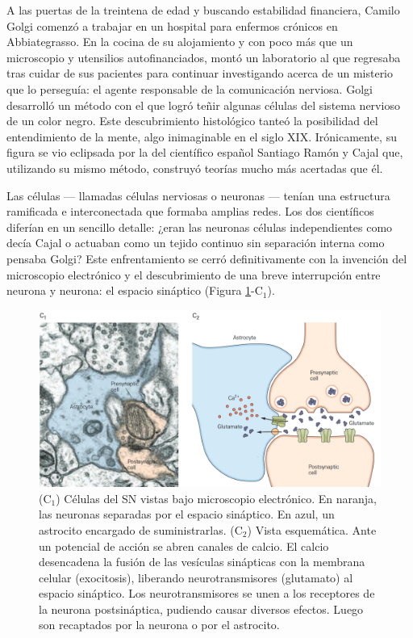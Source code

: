 A las puertas de la treintena de edad y buscando estabilidad financiera, Camilo Golgi comenzó a trabajar en un hospital para enfermos crónicos en Abbiategrasso. En la cocina de su alojamiento y con poco más que un microscopio y utensilios autofinanciados, montó un laboratorio al que regresaba tras cuidar de sus pacientes para continuar investigando acerca de un misterio que lo perseguía: el agente responsable de la comunicación nerviosa. Golgi desarrolló un método con el que logró teñir algunas células del sistema nervioso de un color negro. Este descubrimiento histológico tanteó la posibilidad del entendimiento de la mente, algo inimaginable en el siglo XIX. Irónicamente, su figura se vio eclipsada por la del científico español Santiago Ramón y Cajal que, utilizando su mismo método, construyó teorías mucho más acertadas que él.

Las células --- llamadas células nerviosas o neuronas --- tenían una estructura ramificada e interconectada que formaba amplias redes. Los dos científicos diferían en un sencillo detalle: ¿eran las neuronas células independientes como decía Cajal o actuaban como un tejido continuo sin separación interna como pensaba Golgi? Este enfrentamiento se cerró definitivamente con la invención del microscopio electrónico y el descubrimiento de una breve interrupción entre neurona y neurona: el espacio sináptico (Figura \ref{synapse}-C$_1$).

\begin{figure}[H]
	\centering

	\includegraphics[width=\linewidth]{media/3-synapse.png}
	\caption{(C$_1$) Células del SN vistas bajo microscopio electrónico. En naranja, las neuronas separadas por el espacio sináptico. En azul, un astrocito encargado de suministrarlas. (C$_2$) Vista esquemática. Ante un potencial de acción se abren canales de calcio. El calcio desencadena la fusión de las vesículas sinápticas con la membrana celular (exocitosis), liberando neurotransmisores (glutamato) al espacio sináptico. Los neurotransmisores se unen a los receptores de la neurona postsináptica, pudiendo causar diversos efectos. Luego son recaptados por la neurona o por el astrocito.}
	\label{synapse}
\end{figure}

